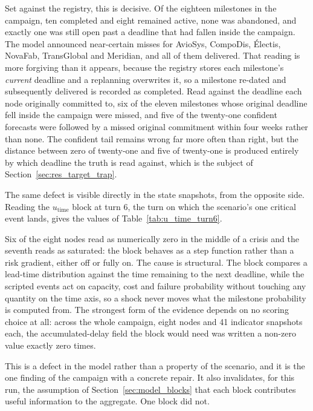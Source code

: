 Set against the registry, this is decisive. Of the eighteen milestones in the campaign, ten
completed and eight remained active, none was abandoned, and exactly one was still open past a
deadline that had fallen inside the campaign. The model announced near-certain misses for
AvioSys, CompoDis, \'Electis, NovaFab, TransGlobal and Meridian, and all of them delivered.
That reading is more forgiving than it appears, because the registry stores each milestone's
\emph{current} deadline and a replanning overwrites it, so a milestone re-dated and
subsequently delivered is recorded as completed. Read against the deadline each node
originally committed to, six of the eleven milestones whose original deadline fell inside the
campaign were missed, and five of the twenty-one confident forecasts were followed by a missed
original commitment within four weeks rather than none. The confident tail remains wrong far
more often than right, but the distance between zero of twenty-one and five of twenty-one is
produced entirely by which deadline the truth is read against, which is the subject of
Section~\ref{sec:res_target_trap}.

The same defect is visible directly in the state snapshots, from the opposite side. Reading
the $u_{\text{time}}$ block at turn 6, the turn on which the scenario's one critical event
lands, gives the values of Table~\ref{tab:u_time_turn6}.

Six of the eight nodes read as numerically zero in the middle of a crisis and the seventh
reads as saturated: the block behaves as a step function rather than a risk gradient, either
off or fully on. The cause is structural. The block compares a lead-time distribution against
the time remaining to the next deadline, while the scripted events act on capacity, cost and
failure probability without touching any quantity on the time axis, so a shock never moves
what the milestone probability is computed from. The strongest form of the evidence depends on
no scoring choice at all: across the whole campaign, eight nodes and 41 indicator snapshots
each, the accumulated-delay field the block would need was written a non-zero value exactly
zero times.

This is a defect in the model rather than a property of the scenario, and it is the one
finding of the campaign with a concrete repair. It also invalidates, for this run, the assumption of
Section~\ref{sec:model_blocks} that each block contributes useful information to the
aggregate. One block did not.

